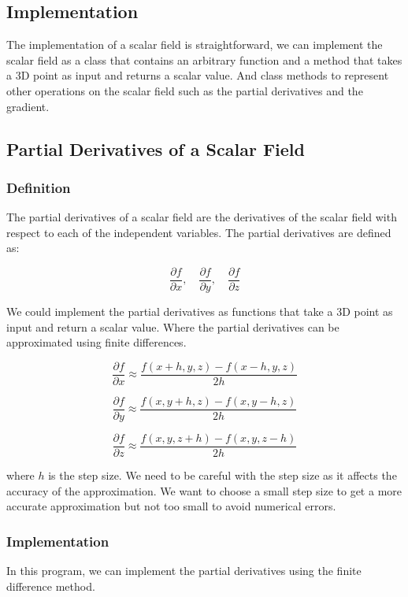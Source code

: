 \documentclass[12pt]{article}
\begin{document}
\subsection{Implementation}

The implementation of a scalar field is straightforward, we can implement the scalar field as a class that contains an arbitrary function and a method that takes a 3D point as input and returns a scalar value.
And class methods to represent other operations on the scalar field such as the partial derivatives and the gradient.

\subsection{Partial Derivatives of a Scalar Field}

\subsubsection{Definition}

The partial derivatives of a scalar field are the derivatives of the scalar field with respect to each of the independent variables. The partial derivatives are defined as:

\[
    \frac{\partial f}{\partial x}, \quad \frac{\partial f}{\partial y}, \quad \frac{\partial f}{\partial z}
\]

We could implement the partial derivatives as functions that take a 3D point as input and return a scalar value.
Where the partial derivatives can be approximated using finite differences.

\[
    \frac{\partial f}{\partial x} \approx \frac{f(x + h, y, z) - f(x - h, y, z)}{2h}
\]

\[
    \frac{\partial f}{\partial y} \approx \frac{f(x, y + h, z) - f(x, y - h, z)}{2h}
\]

\[
    \frac{\partial f}{\partial z} \approx \frac{f(x, y, z + h) - f(x, y, z - h)}{2h}
\]

where \(h\) is the step size. We need to be careful with the step size as it affects the accuracy of the approximation. We want to choose a small step size to get a more accurate approximation but not too small to avoid numerical errors.

\subsubsection{Implementation}

In this program, we can implement the partial derivatives using the finite difference method.
\end{document}
